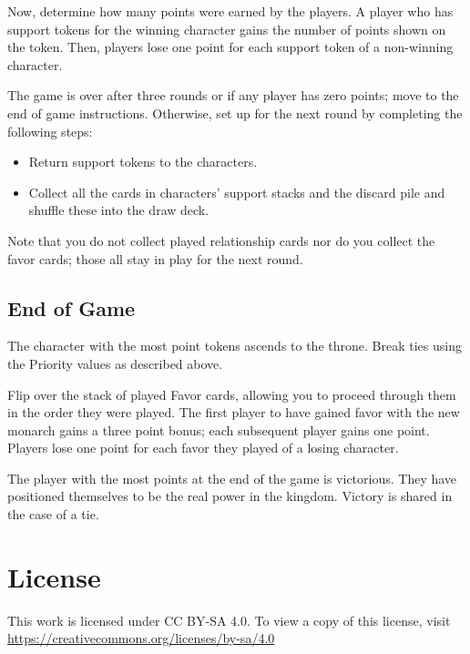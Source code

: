 \documentclass{article}
\begin{document}
Now, determine how many points were earned by the players.
A player who has support tokens for the winning character
gains the number of points shown on the token. Then, players
lose one point for each support token of a non-winning character.

The game is over after three rounds or if any player has
zero points; move to the end of game instructions.
Otherwise, set up for the next round by completing the following steps:
\begin{itemize}
\item Return support tokens to the characters.
\item Collect all the cards in characters' support stacks and the
  discard pile and shuffle these into the draw deck.
\end{itemize}

Note that you do not collect played relationship cards nor do you
collect the favor cards; those all stay in play for the next round.

\subsection*{End of Game}

The character with the most point tokens ascends to the throne.
Break ties using the Priority values as described above.

Flip over the stack of played Favor cards, allowing you to proceed
through them in the order they were played.  The first player to have
gained favor with the new monarch gains a three point bonus; each
subsequent player gains one point.  Players lose one point for each
favor they played of a losing character.

The player with the most points at the end of the game is victorious.
They have positioned themselves to be the real power in the kingdom.
Victory is shared in the case of a tie.

\section*{License}

This work is licensed under CC BY-SA 4.0. To view a copy of
this license, visit \url{https://creativecommons.org/licenses/by-sa/4.0}
\end{document}
